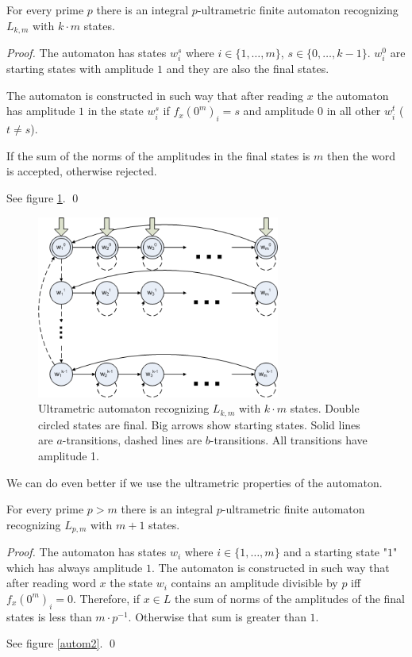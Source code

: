 \documentclass{llncs}
\begin{document}
\begin{theorem}
For every prime $p$ there is an integral $p$-ultrametric finite automaton recognizing $L_{k,m}$ with $k \cdot m$ states.
\end{theorem}
\begin{proof}
The automaton has states $w_i^s$ where $i \in \{1, \ldots, m\}$, $s \in \{0, \ldots, k-1\}$.
$w_i^0$ are starting states with amplitude $1$ and they are also the final states.

The automaton is constructed in such way that after reading $x$ the automaton has amplitude $1$ in the state $w_i^s$ if $f_x(0^m)_i = s$ and amplitude $0$ in all other $w_i^t$ ($t \not = s$).

If the sum of the norms of the amplitudes in the final states is $m$ then the word is accepted, otherwise rejected.

See figure \ref{autom1}.
\qed
\end{proof}

\begin{figure}[H]
  \centering
  \includegraphics[width = 8cm]{autom_km.png}
  \caption{Ultrametric automaton recognizing $L_{k,m}$ with $k \cdot m$ states.
  Double circled states are final.
  Big arrows show starting states.
  Solid lines are $a$-transitions, dashed lines are $b$-transitions.
  All transitions have amplitude 1. }
  \label{autom1}
\end{figure}

We can do even better if we use the ultrametric properties of the automaton.

\begin{theorem}
For every prime $p > m$ there is an integral $p$-ultrametric finite automaton recognizing $L_{p,m}$ with $m+1$ states.
\end{theorem}
\begin{proof}
The automaton has states $w_i$ where $i \in \{1, \ldots, m\}$ and a starting state "$1$" which has always amplitude $1$.
The automaton is constructed in such way that after reading word $x$ the state $w_i$ contains an amplitude divisible by $p$ iff $f_x(0^m)_i = 0$.
Therefore, if $x \in L$ the sum of norms of the amplitudes of the final states is less than $m \cdot p^{-1}$. Otherwise that sum is greater than $1$.

See figure \ref{autom2}.
\qed
\end{proof}
\end{document}
